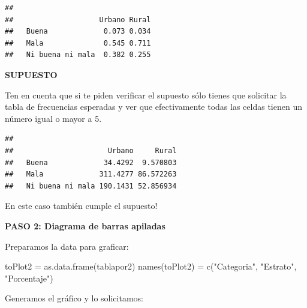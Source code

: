 \documentclass[
]{article}
\newenvironment{Shaded}{\begin{snugshade}}{\end{snugshade}}
\newcommand{\FunctionTok}[1]{\textcolor[rgb]{0.00,0.00,0.00}{#1}}
\newcommand{\NormalTok}[1]{#1}
\newcommand{\OtherTok}[1]{\textcolor[rgb]{0.56,0.35,0.01}{#1}}
\newcommand{\SpecialCharTok}[1]{\textcolor[rgb]{0.00,0.00,0.00}{#1}}
\newcommand{\StringTok}[1]{\textcolor[rgb]{0.31,0.60,0.02}{#1}}
\begin{document}
\begin{verbatim}
##                   
##                    Urbano Rural
##   Buena             0.073 0.034
##   Mala              0.545 0.711
##   Ni buena ni mala  0.382 0.255
\end{verbatim}

\textbf{SUPUESTO}

Ten en cuenta que si te piden verificar el supuesto sólo tienes que
solicitar la tabla de frecuencias esperadas y ver que efectivamente
todas las celdas tienen un número igual o mayor a 5.

\begin{Shaded}
\end{Shaded}

\begin{verbatim}
##                   
##                      Urbano     Rural
##   Buena             34.4292  9.570803
##   Mala             311.4277 86.572263
##   Ni buena ni mala 190.1431 52.856934
\end{verbatim}

En este caso también cumple el supuesto!

\textbf{PASO 2: Diagrama de barras apiladas}

Preparamos la data para graficar:

\begin{Shaded}
\begin{Highlighting}[]
\NormalTok{toPlot2 }\OtherTok{=} \FunctionTok{as.data.frame}\NormalTok{(tablapor2) }
\FunctionTok{names}\NormalTok{(toPlot2) }\OtherTok{=} \FunctionTok{c}\NormalTok{(}\StringTok{"Categoria"}\NormalTok{, }\StringTok{"Estrato"}\NormalTok{, }\StringTok{"Porcentaje"}\NormalTok{)}
\end{Highlighting}
\end{Shaded}

Generamos el gráfico y lo solicitamos:
\end{document}
